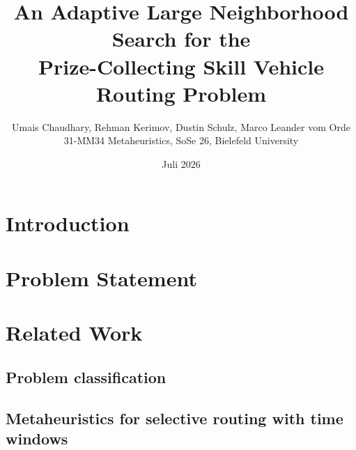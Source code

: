 \documentclass[10pt, a4paper]{article}
\title{An Adaptive Large Neighborhood Search for the\\
       Prize-Collecting Skill Vehicle Routing Problem}
\author{Umais Chaudhary, Rehman Kerimov, Dustin Schulz, Marco Leander vom Orde \\ \small 31-MM34 Metaheuristics, SoSe 26, Bielefeld University}
\date{Juli 2026}
\begin{document}
\maketitle

\begin{abstract}
\end{abstract}

\section{Introduction}

\section{Problem Statement}

\section{Related Work}
\subsection{Problem classification}
\subsection{Metaheuristics for selective routing with time windows}
\end{document}
